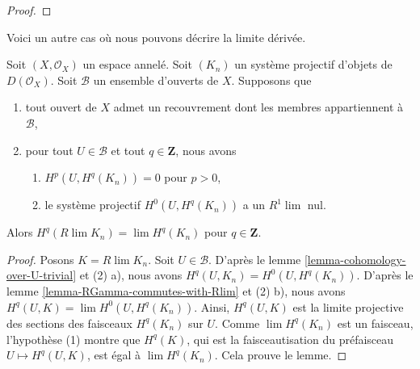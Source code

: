 {\begin{proof}
\end{proof}

\noindent
Voici un autre cas où nous pouvons décrire la limite dérivée.

\begin{lemma}

\label{lemma-derived-limit-suitable-system}

Soit $(X, \mathcal{O}_X)$ un espace annelé. Soit $(K_n)$
un système projectif d'objets de $D(\mathcal{O}_X)$. Soit $\mathcal{B}$ un ensemble d'ouverts de $X$. Supposons que

\begin{enumerate}

\item tout ouvert de $X$ admet un recouvrement dont les membres appartiennent à $\mathcal{B}$,
\item pour tout $U \in \mathcal{B}$ et tout $q \in \mathbf{Z}$, nous avons

\begin{enumerate}

\item  $H^p(U, H^q(K_n)) = 0$ pour $p > 0$,
\item le système projectif $H^0(U, H^q(K_n))$ a un $R^1\lim$ nul.

\end{enumerate}

\end{enumerate}

Alors $H^q(R\lim K_n) = \lim H^q(K_n)$ pour $q \in \mathbf{Z}$.

\end{lemma}

\begin{proof}

Posons $K = R\lim K_n$. Soit $U \in \mathcal{B}$. D'après le lemme \ref{lemma-cohomology-over-U-trivial} et (2) a), nous avons $H^q(U, K_n) = H^0(U, H^q(K_n))$. D'après le lemme \ref{lemma-RGamma-commutes-with-Rlim} et (2) b), nous avons 
$H^q(U, K) = \lim H^0(U, H^q(K_n))$. Ainsi, $H^q(U, K)$ est la limite projective des sections des faisceaux $H^q(K_n)$ sur $U$. Comme
$\lim H^q(K_n)$ est un faisceau, l'hypothèse (1) montre que $H^q(K)$, qui est la faisceautisation du préfaisceau $U \mapsto H^q(U, K)$, est égal à $\lim H^q(K_n)$. Cela prouve le lemme.

\end{proof}







}
